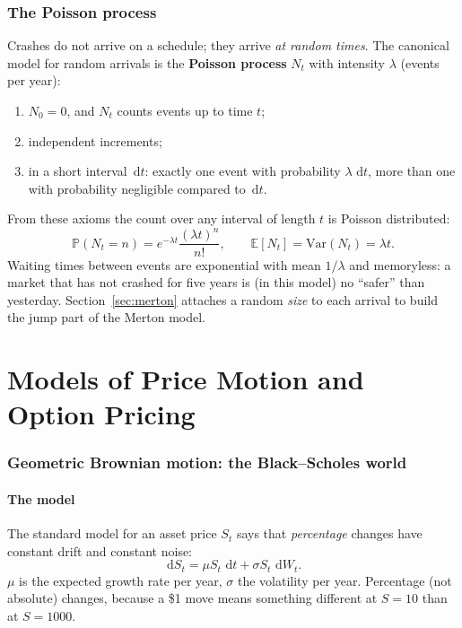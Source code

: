\documentclass[11pt,a4paper]{article}
\newcommand{\E}{\mathbb{E}}
\newcommand{\Prob}{\mathbb{P}}
\newcommand{\Var}{\mathrm{Var}}
\newcommand{\dd}{\,\mathrm{d}}
\begin{document}
\section{The Poisson process}
\label{sec:poisson}

Crashes do not arrive on a schedule; they arrive \emph{at random times}. The
canonical model for random arrivals is the \textbf{Poisson process} $N_t$ with
intensity $\lambda$ (events per year):
\begin{enumerate}[itemsep=1pt]
\item $N_0=0$, and $N_t$ counts events up to time $t$;
\item independent increments;
\item in a short interval $\dd t$: exactly one event with probability
  $\lambda\,\dd t$, more than one with probability negligible compared to
  $\dd t$.
\end{enumerate}
From these axioms the count over any interval of length $t$ is Poisson
distributed:
\begin{equation}
\Prob(N_t=n)=e^{-\lambda t}\frac{(\lambda t)^n}{n!},\qquad
\E[N_t]=\Var(N_t)=\lambda t .
\label{eq:poispmf}
\end{equation}
Waiting times between events are exponential with mean $1/\lambda$ and
memoryless: a market that has not crashed for five years is (in this model) no
``safer'' than yesterday. Section~\ref{sec:merton} attaches a random \emph{size}
to each arrival to build the jump part of the Merton model.

\part{Models of Price Motion and Option Pricing}

\section{Geometric Brownian motion: the Black--Scholes world}
\label{sec:gbm}

\subsection{The model}
The standard model for an asset price $S_t$ says that \emph{percentage} changes
have constant drift and constant noise:
\begin{equation}
\dd S_t=\mu S_t\,\dd t+\sigma S_t\,\dd W_t .
\label{eq:gbmsde}
\end{equation}
$\mu$ is the expected growth rate per year, $\sigma$ the volatility per year.
Percentage (not absolute) changes, because a \$1 move means something different
at $S=10$ than at $S=1000$.
\end{document}
